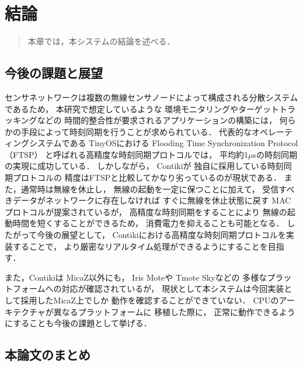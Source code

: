 \chapter{結論}
\begin{large}
\begin{quote}
本章では，本システムの結論を述べる．
\end{quote}
\end{large}
\clearpage

\section{今後の課題と展望}
センサネットワークは複数の無線センサノードによって構成される分散システムであるため，
本研究で想定しているような
環境モニタリングやターゲットトラッキングなどの
時間的整合性が要求されるアプリケーションの構築には，
何らかの手段によって時刻同期を行うことが求められている．
代表的なオペレーティングシステムである
TinyOS\cite{Hill:2000:SAD:356989.356998}\cite{Levis04tinyos:an}における
Flooding Time Synchronization Protocol（FTSP）\cite{Maroti:2004:FTS:1031495.1031501}
と呼ばれる高精度な時刻同期プロトコルでは，
平均約1$\mu$sの時刻同期の実現に成功している．
しかしながら，
Contiki\cite{Dunkels:2004:CLF:1032658.1034117}が
独自に採用している時刻同期プロトコルの
精度はFTSPと比較してかなり劣っているのが現状である．
また，通常時は無線を休止し，
無線の起動を一定に保つことに加えて，
受信すべきデータがネットワークに存在しなければ
すぐに無線を休止状態に戻す
MACプロトコルが提案されているが，
高精度な時刻同期をすることにより
無線の起動時間を短くすることができるため，
消費電力を抑えることも可能となる．
したがって今後の展望として，
Contikiにおける高精度な時刻同期プロトコルを実装することで，
より厳密なリアルタイム処理ができるようにすることを目指す．

また，Contikiは
MicaZ\cite{Hill:2002:MWP:623308.624560}以外にも，
Iris Mote\cite{irismote}や
Tmote Sky\cite{tmote_sky}などの
多様なプラットフォームへの対応が確認されているが，
現状として本システムは今回実装として採用したMicaZ上でしか
動作を確認することができていない．
CPUのアーキテクチャが異なるプラットフォームに
移植した際に，
正常に動作できるようにすることも今後の課題として挙げる．



\section{本論文のまとめ}

